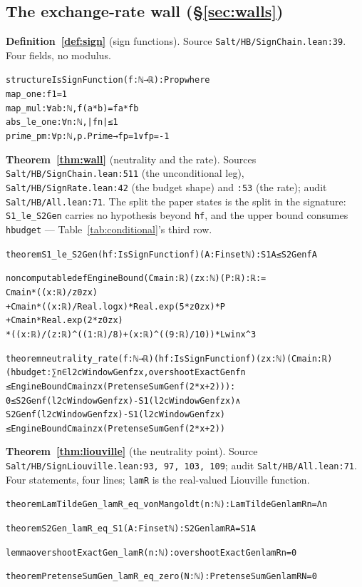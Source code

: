 \documentclass{CUP-JNL-FMP}
\newcommand{\leaninline}[1]{{\small\texttt{#1}}}
\theoremstyle{remark}
\begin{document}
\subsection{The exchange-rate wall (\S\ref{sec:walls})}\label{app:wall}

\medskip\noindent\textbf{Definition~\ref{def:sign}} (sign functions). Source
\leaninline{Salt/HB/SignChain.lean:39}. Four fields, no modulus.
{\footnotesize\begin{alltt}
structure IsSignFunction (f : ℕ → ℝ) : Prop where
  map_one    : f 1 = 1
  map_mul    : ∀ a b : ℕ, f (a * b) = f a * f b
  abs_le_one : ∀ n : ℕ, |f n| ≤ 1
  prime_pm   : ∀ p : ℕ, p.Prime → f p = 1 ∨ f p = -1
\end{alltt}}

\medskip\noindent\textbf{Theorem~\ref{thm:wall}} (neutrality and the rate).
Sources \leaninline{Salt/HB/SignChain.lean:511} (the unconditional leg),
\leaninline{Salt/HB/SignRate.lean:42} (the budget shape) and \leaninline{:53}
(the rate); audit \leaninline{Salt/HB/All.lean:71}. The split the paper states is
the split in the signature: \leaninline{S1\_le\_S2Gen} carries no hypothesis
beyond \leaninline{hf}, and the upper bound consumes \leaninline{hbudget} ---
Table~\ref{tab:conditional}'s third row.
{\footnotesize\begin{alltt}
theorem S1_le_S2Gen (hf : IsSignFunction f) (A : Finset ℕ) : S1 A ≤ S2Gen f A

noncomputable def EngineBound (Cmain : ℝ) (z x : ℕ) (P : ℝ) : ℝ :=
  Cmain * ((x : ℝ) / z0 z x)
    + Cmain * ((x : ℝ) / Real.log x) * Real.exp (5 * z0 z x) * P
    + Cmain * Real.exp (2 * z0 z x)
        * ((x : ℝ) / (z : ℝ) ^ ((1 : ℝ) / 8) + (x : ℝ) ^ ((9 : ℝ) / 10)) * Lwin x ^ 3

theorem neutrality_rate (f : ℕ → ℝ) (hf : IsSignFunction f) (z x : ℕ) (Cmain : ℝ)
    (hbudget : ∑ n ∈ l2cWindowGen f z x, overshootExactGen f n
        ≤ EngineBound Cmain z x (PretenseSumGen f (2 * x + 2))) :
    0 ≤ S2Gen f (l2cWindowGen f z x) - S1 (l2cWindowGen f z x) ∧
      S2Gen f (l2cWindowGen f z x) - S1 (l2cWindowGen f z x)
        ≤ EngineBound Cmain z x (PretenseSumGen f (2 * x + 2))
\end{alltt}}

\medskip\noindent\textbf{Theorem~\ref{thm:liouville}} (the neutrality point).
Source \leaninline{Salt/HB/SignLiouville.lean:93, 97, 103, 109}; audit
\leaninline{Salt/HB/All.lean:71}. Four statements, four lines;
\leaninline{lamR} is the real-valued Liouville function.
{\footnotesize\begin{alltt}
theorem LamTildeGen_lamR_eq_vonMangoldt (n : ℕ) : LamTildeGen lamR n = Λ n

theorem S2Gen_lamR_eq_S1 (A : Finset ℕ) : S2Gen lamR A = S1 A

lemma overshootExactGen_lamR (n : ℕ) : overshootExactGen lamR n = 0

theorem PretenseSumGen_lamR_eq_zero (N : ℕ) : PretenseSumGen lamR N = 0
\end{alltt}}
\end{document}
